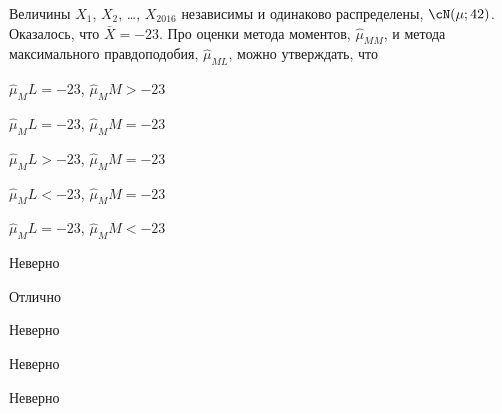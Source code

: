 
\begin{question}
Величины \(X_1\), \(X_2\), \ldots, \(X_{2016}\) независимы и одинаково
распределены, \(\cN(\mu ; 42)\). Оказалось, что \(\bar X = -23\). Про
оценки метода моментов, \(\hat \mu_{MM}\), и метода максимального
правдоподобия, \(\hat \mu_{ML}\), можно утверждать, что
\begin{answerlist}
  \item \(\hat \mu_ML = -23\), \(\hat\mu_MM > -23\)
  \item \(\hat \mu_ML = -23\), \(\hat\mu_MM = -23\)
  \item \(\hat \mu_ML > -23\), \(\hat\mu_MM = -23\)
  \item \(\hat \mu_ML < -23\), \(\hat\mu_MM = -23\)
  \item \(\hat \mu_ML = -23\), \(\hat\mu_MM < -23\)
\end{answerlist}
\end{question}

\begin{solution}
\begin{answerlist}
  \item Неверно
  \item Отлично
  \item Неверно
  \item Неверно
  \item Неверно
\end{answerlist}
\end{solution}

